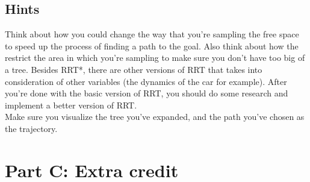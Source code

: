 \documentclass[letter]{article}
\begin{document}
\subsection{Hints}
Think about how you could change the way that you're sampling the free space to speed up the process of finding a path to the goal. Also think about how the restrict the area in which you're sampling to make sure you don't have too big of a tree. Besides RRT*, there are other versions of RRT that takes into consideration of other variables (the dynamics of the car for example). After you're done with the basic version of RRT, you should do some research and implement a better version of RRT.\\
Make sure you visualize the tree you've expanded, and the path you've chosen as the trajectory.

\section{Part C: Extra credit}
\end{document}
